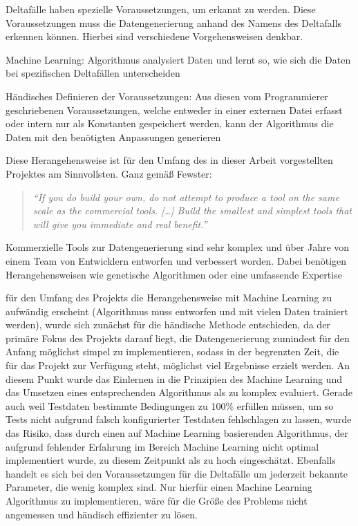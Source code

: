 Deltafälle haben spezielle Voraussetzungen, um erkannt zu werden. Diese Voraussetzungen muss die Datengenerierung anhand des Namens des Deltafalls erkennen können. Hierbei sind verschiedene Vorgehensweisen denkbar. 

Machine Learning: Algorithmus analysiert Daten und lernt so, wie sich die Daten bei spezifischen Deltafällen unterscheiden

Händisches Definieren der Voraussetzungen: Aus diesen vom Programmierer geschriebenen Voraussetzungen, welche entweder in einer externen Datei erfasst oder intern nur als Konstanten gespeichert werden, kann der Algorithmus die Daten mit den benötigten Anpassungen generieren

Diese Herangehensweise ist für den Umfang des in dieser Arbeit vorgestellten Projektes am Sinnvollsten. Ganz gemäß Fewster:

\begin{quote}
    \textit{\enquote{If you do build your own, do not attempt to produce a tool on the same scale as the commercial tools. [\dots] Build the smallest and simplest tools that will give you immediate and real benefit.} \cite{fewster:1999}}
\end{quote}

Kommerzielle Tools zur Datengenerierung sind sehr komplex und über Jahre von einem Team von Entwicklern entworfen und verbessert worden. Dabei benötigen Herangehensweisen wie genetische Algorithmen oder eine umfassende Expertise 

für den Umfang des Projekts die Herangehensweise mit Machine Learning zu aufwändig erscheint (Algorithmus muss entworfen und mit vielen Daten trainiert werden), wurde sich zunächst für die händische Methode entschieden, da der primäre Fokus des Projekts darauf liegt, die Datengenerierung zumindest für den Anfang möglichst simpel zu implementieren, sodass in der begrenzten Zeit, die für das Projekt zur Verfügung steht, möglichst viel Ergebnisse erzielt werden. An diesem Punkt wurde das Einlernen in die Prinzipien des Machine Learning und das Umsetzen eines entsprechenden Algorithmus als zu komplex evaluiert. Gerade auch weil Testdaten bestimmte Bedingungen zu 100\% erfüllen müssen, um so Tests nicht aufgrund falsch konfigurierter Testdaten fehlschlagen zu lassen, wurde das Risiko, dass durch einen auf Machine Learning basierenden Algorithmus, der aufgrund fehlender Erfahrung im Bereich Machine Learning nicht optimal implementiert wurde, zu diesem Zeitpunkt als zu hoch eingeschätzt. Ebenfalls handelt es sich bei den Voraussetzungen für die Deltafälle um jederzeit bekannte Parameter, die wenig komplex sind. Nur hierfür einen Machine Learning Algorithmus zu implementieren, wäre für die Größe des Problems nicht angemessen und händisch effizienter zu lösen.


